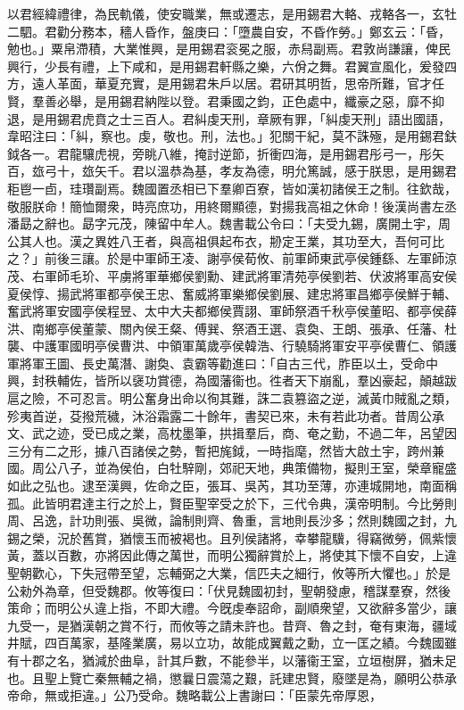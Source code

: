 \begin{pinyinscope}
以君經緯禮律，為民軌儀，使安職業，無或遷志，是用錫君大輅、戎輅各一，玄牡二駟。君勸分務本，穡人昏作，盤庚曰：「墮農自安，不昏作勞。」鄭玄云：「昏，勉也。」粟帛滯積，大業惟興，是用錫君衮冕之服，赤舄副焉。君敦尚謙讓，俾民興行，少長有禮，上下咸和，是用錫君軒縣之樂，六佾之舞。君翼宣風化，爰發四方，遠人革面，華夏充實，是用錫君朱戶以居。君研其明哲，思帝所難，官才任賢，羣善必舉，是用錫君納陛以登。君秉國之鈞，正色處中，纖豪之惡，靡不抑退，是用錫君虎賁之士三百人。君糾虔天刑，章厥有罪，「糾虔天刑」語出國語，韋昭注曰：「糾，察也。虔，敬也。刑，法也。」犯關干紀，莫不誅殛，是用錫君鈇鉞各一。君龍驤虎視，旁眺八維，掩討逆節，折衝四海，是用錫君彤弓一，彤矢百，玈弓十，玈矢千。君以溫恭為基，孝友為德，明允篤誠，感于朕思，是用錫君秬鬯一卣，珪瓚副焉。魏國置丞相已下羣卿百寮，皆如漢初諸侯王之制。往欽哉，敬服朕命！簡恤爾衆，時亮庶功，用終爾顯德，對揚我高祖之休命！後漢尚書左丞潘勗之辭也。勗字元茂，陳留中牟人。魏書載公令曰：「夫受九錫，廣開土宇，周公其人也。漢之異姓八王者，與高祖俱起布衣，刱定王業，其功至大，吾何可比之？」前後三讓。於是中軍師王凌、謝亭侯荀攸、前軍師東武亭侯鍾繇、左軍師涼茂、右軍師毛玠、平虜將軍華鄉侯劉勳、建武將軍清苑亭侯劉若、伏波將軍高安侯夏侯惇、揚武將軍都亭侯王忠、奮威將軍樂鄉侯劉展、建忠將軍昌鄉亭侯鮮于輔、奮武將軍安國亭侯程昱、太中大夫都鄉侯賈詡、軍師祭酒千秋亭侯董昭、都亭侯薛洪、南鄉亭侯董蒙、關內侯王粲、傅巽、祭酒王選、袁奐、王朗、張承、任藩、杜襲、中護軍國明亭侯曹洪、中領軍萬歲亭侯韓浩、行驍騎將軍安平亭侯曹仁、領護軍將軍王圖、長史萬潛、謝奐、袁霸等勸進曰：「自古三代，胙臣以土，受命中興，封秩輔佐，皆所以襃功賞德，為國藩衞也。徃者天下崩亂，羣凶豪起，顛越跋扈之險，不可忍言。明公奮身出命以徇其難，誅二袁篡盜之逆，滅黃巾賊亂之類，殄夷首逆，芟撥荒穢，沐浴霜露二十餘年，書契已來，未有若此功者。昔周公承文、武之迹，受已成之業，高枕墨筆，拱揖羣后，商、奄之勤，不過二年，呂望因三分有二之形，據八百諸侯之勢，暫把旄鉞，一時指麾，然皆大啟土宇，跨州兼國。周公八子，並為侯伯，白牡騂剛，郊祀天地，典策備物，擬則王室，榮章寵盛如此之弘也。逮至漢興，佐命之臣，張耳、吳芮，其功至薄，亦連城開地，南面稱孤。此皆明君達主行之於上，賢臣聖宰受之於下，三代令典，漢帝明制。今比勞則周、呂逸，計功則張、吳微，論制則齊、魯重，言地則長沙多；然則魏國之封，九錫之榮，況於舊賞，猶懷玉而被褐也。且列侯諸將，幸攀龍驥，得竊微勞，佩紫懷黃，蓋以百數，亦將因此傳之萬世，而明公獨辭賞於上，將使其下懷不自安，上違聖朝歡心，下失冠帶至望，忘輔弼之大業，信匹夫之細行，攸等所大懼也。」於是公勑外為章，但受魏郡。攸等復曰：「伏見魏國初封，聖朝發慮，稽謀羣寮，然後策命；而明公乆違上指，不即大禮。今旣虔奉詔命，副順衆望，又欲辭多當少，讓九受一，是猶漢朝之賞不行，而攸等之請未許也。昔齊、魯之封，奄有東海，疆域井賦，四百萬家，基隆業廣，易以立功，故能成翼戴之勳，立一匡之績。今魏國雖有十郡之名，猶減於曲阜，計其戶數，不能參半，以藩衞王室，立垣樹屏，猶未足也。且聖上覽亡秦無輔之禍，懲曩日震蕩之艱，託建忠賢，廢墜是為，願明公恭承帝命，無或拒違。」公乃受命。魏略載公上書謝曰：「臣蒙先帝厚恩，
\end{pinyinscope}
